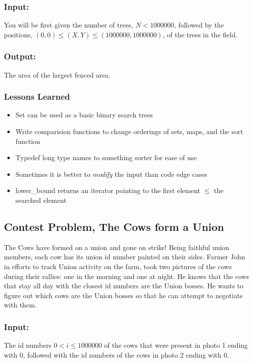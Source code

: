 \subsubsection{Input:} 
You will be first given the number of trees, $N<1000000$, followed by the positions, $(0,0) \leq (X,Y) \leq (1000000, 1000000)$, of the trees in the field. 

\subsubsection{Output:} 
The area of the largest fenced area.



\subsubsection{Lessons Learned}

\begin{itemize}
	\item	Set can be used as a basic binary search trees
	\item	Write comparision functions to change orderings of sets, maps, and the sort function
	\item	Typedef long type names to something sorter for ease of use
	\item	Sometimes it is better to \emph{modify} the input than code edge cases
	\item	lower\_bound returns an iterator pointing to the first element $\leq$ the searched element
\end{itemize}

\subsection{Contest Problem, The Cows form a Union}
The Cows have formed on a union and gone on strike!
Being faithful union members, each cow has its union id number painted on their sides.
Farmer John in efforts to track Union activity on the farm, took two pictures of the cows during their rallies: one in the morning and one at night.
He knows that the cows that stay all day with the closest id numbers are the Union bosses.
He wants to figure out which cows are the Union bosses so that he can attempt to negotiate with them.
\subsubsection{Input:} The id numbers $0 < i \leq 1000000$ of the cows that were present in photo 1 ending with 0, followed with the id numbers of the cows in photo 2 ending with 0.
